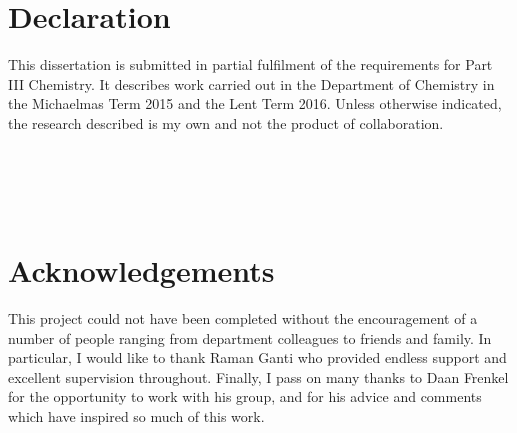 \documentclass[a4paper,12pt,openright,oneside]{article}
\begin{document}
\cleardoublepage

\cleardoublepage
{}
\thispagestyle{empty}
\cleardoublepage
\section*{Declaration}

This dissertation is submitted in partial fulfilment of the requirements for Part III Chemistry. It describes work carried out in the Department of Chemistry in the Michaelmas Term 2015 and the Lent Term 2016. Unless otherwise indicated, the research described is my own and not the product of collaboration.
\\
\\
\\
\\
\\
\section*{Acknowledgements}

This project could not have been completed without the encouragement of a number of people ranging from department colleagues to friends and family.
In particular, I would like to thank Raman Ganti who provided endless support and excellent supervision throughout.
Finally, I pass on many thanks to Daan Frenkel for the opportunity to work with his group, and for his advice and comments which have inspired so much of this work.

\newpage

\cleardoublepage

\newpage

\tableofcontents


\newpage
\cleardoublepage
{}
\fancyhead{}
\rhead{\thepage}
\lhead{\leftmark}
\lfoot[]{}
\rfoot[]{}
\cfoot[]{}
\pagestyle{fancy}
    
\end{document}
